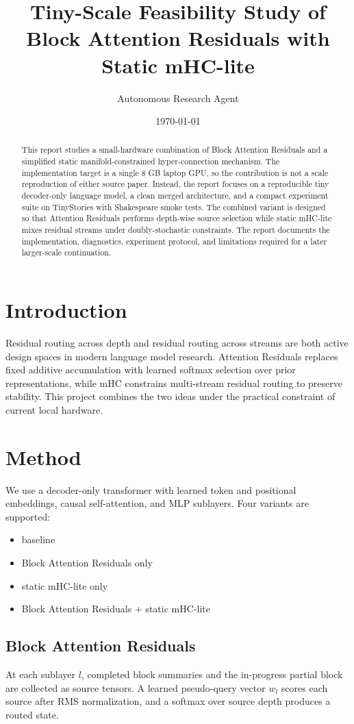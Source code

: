 \documentclass[11pt]{article}
\title{Tiny-Scale Feasibility Study of Block Attention Residuals with Static mHC-lite}
\author{Autonomous Research Agent}
\date{\today}
\begin{document}
\maketitle

\begin{abstract}
This report studies a small-hardware combination of Block Attention Residuals and a simplified static manifold-constrained hyper-connection mechanism. The implementation target is a single 8 GB laptop GPU, so the contribution is not a scale reproduction of either source paper. Instead, the report focuses on a reproducible tiny decoder-only language model, a clean merged architecture, and a compact experiment suite on TinyStories with Shakespeare smoke tests. The combined variant is designed so that Attention Residuals performs depth-wise source selection while static mHC-lite mixes residual streams under doubly-stochastic constraints. The report documents the implementation, diagnostics, experiment protocol, and limitations required for a later larger-scale continuation.
\end{abstract}

\section{Introduction}
Residual routing across depth and residual routing across streams are both active design spaces in modern language model research. Attention Residuals replaces fixed additive accumulation with learned softmax selection over prior representations, while mHC constrains multi-stream residual routing to preserve stability. This project combines the two ideas under the practical constraint of current local hardware.

\section{Method}
We use a decoder-only transformer with learned token and positional embeddings, causal self-attention, and MLP sublayers. Four variants are supported:
\begin{itemize}
\item baseline
\item Block Attention Residuals only
\item static mHC-lite only
\item Block Attention Residuals + static mHC-lite
\end{itemize}

\subsection{Block Attention Residuals}
At each sublayer $l$, completed block summaries and the in-progress partial block are collected as source tensors. A learned pseudo-query vector $w_l$ scores each source after RMS normalization, and a softmax over source depth produces a routed state.
\end{document}

